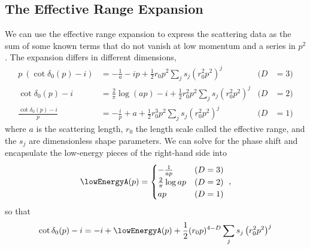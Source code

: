 \subsection{The Effective Range Expansion}\label{sec:ere}

We can use the effective range expansion to express the scattering data as the sum of some known terms that do not vanish at low momentum and a series in $p^2$.  The expansion differs in different dimensions,
\begin{align}
    p\ (\cot \delta_0(p) - i)
    &=
    -\frac{1}{a} - ip + \frac{1}{2} r_0 p^2 \sum_j s_j (r_0^2 p^2)^j
    &
    (D&=3)
    \nonumber\\
    \cot \delta_0(p) - i
    &=
    \frac{2}{\pi} \log(a p) -i + \frac{1}{2} r_0^2 p^2 \sum_j s_j (r_0^2 p^2)^j
    &
    (D&=2)
    \\\nonumber
    \frac{\cot\delta_0(p)-i}{p}
    &=
    -\frac{i}{p} + a + \frac{1}{2} r_0^3 p^2 \sum_j s_j( r_0^2 p^2)^j
    &
    (D&=1)
\end{align}
where $a$ is the scattering length, $r_0$ the length scale called the effective range, and the $s_j$ are dimensionless shape parameters.
We can solve for the phase shift and encapsulate the low-energy pieces of the right-hand side into
\begin{equation}
    \lowEnergyA(p) =
    \begin{cases}
        -\frac{1}{ap}           &   (D=3)\\
        \frac{2}{\pi} \log ap   &   (D=2)\\
        ap                      &   (D=1)
    \end{cases}\ ,
\end{equation}
so that
\begin{equation}
    \cot \delta_0(p) - i = -i + \lowEnergyA(p) + \frac{1}{2} (r_0 p)^{4-D} \sum_j s_j \left(r_0^2p^2\right)^j
\end{equation}
